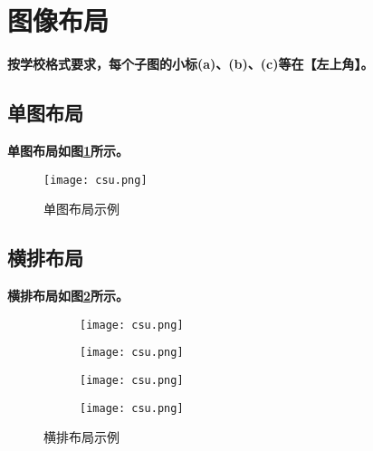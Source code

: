 \section{图像布局}
\label{sec.figure}
\textbf{按学校格式要求，每个子图的小标(a)、(b)、(c)等在【左上角】。}

\subsection{单图布局}

\lipsum

\textbf{单图布局如图\ref{F.csu_single}所示。}

\begin{figure}[hbt]
\centering
\texttt{[image: csu.png]}
\caption{单图布局示例}
\label{F.csu_single}
\end{figure}

\subsection{横排布局}

\textbf{横排布局如图\ref{F.csu_row}所示。}

\begin{figure}[!htb]
    \centering
    \begin{subfigure}[t]{0.24\linewidth}
        \caption{}
        \begin{minipage}[b]{1\linewidth}
        \texttt{[image: csu.png]}
        \end{minipage}
    \end{subfigure}
    \begin{subfigure}[t]{0.24\linewidth}
        \caption{}
        \begin{minipage}[b]{1\linewidth}
        \texttt{[image: csu.png]}
        \end{minipage}
    \end{subfigure}
    \begin{subfigure}[t]{0.24\linewidth}
        \caption{}
        \begin{minipage}[b]{1\linewidth}
        \texttt{[image: csu.png]}
        \end{minipage}
    \end{subfigure}
    \begin{subfigure}[t]{0.24\linewidth}
        \caption{}
        \begin{minipage}[b]{1\linewidth}
        \texttt{[image: csu.png]}
        \end{minipage}
    \end{subfigure}
    \caption{横排布局示例}
    \label{F.csu_row}
\end{figure}

